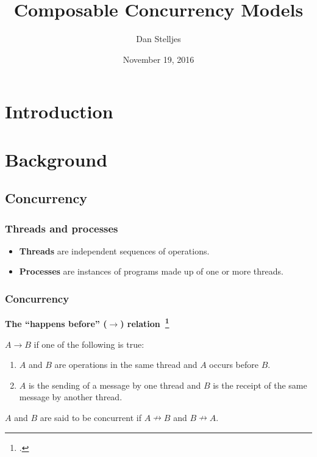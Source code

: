 \documentclass[aspectratio=1610]{beamer}
\title{Composable Concurrency Models}
\date{November 19, 2016}
\author{Dan Stelljes}
\begin{document}
  \maketitle

  \section*{Introduction}

  \begin{frame}
    \centering
    \resizebox{0.8\linewidth}{!}{}
  \end{frame}

  \begin{frame}
    \begin{multicols}{2}
      \tableofcontents
    \end{multicols}
  \end{frame}

  \section{Background}

  \subsection{Concurrency}

  \begin{frame}
    \frametitle{Threads and processes}

    \begin{figure}
      \centering
      
    \end{figure}

    \vfill

    \begin{itemize}
      \item \textbf{Threads} are independent sequences of operations.
      \item \textbf{Processes} are instances of programs made up of one or more threads.
    \end{itemize}
  \end{frame}

  \begin{frame}
    \frametitle{Concurrency}

    \textbf{The ``happens before'' ($\rightarrow$) relation~\footcite{Lamport1977}}

    $A \rightarrow B$ if one of the following is true:

    \begin{enumerate}
      \item $A$ and $B$ are operations in the same thread and $A$ occurs before $B$.
      \item $A$ is the sending of a message by one thread and $B$ is the receipt of the same message by another thread.
    \end{enumerate}

    $A$ and $B$ are said to be concurrent if $A \nrightarrow B$ and $B \nrightarrow A$.
  \end{frame}
\end{document}
